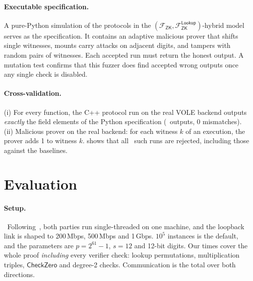 \documentclass[10pt,twocolumn]{article}
\theoremstyle{remark}
\newcommand{\Fzk}{\mathcal{F}_{\mathsf{ZK}}}
\newcommand{\Flk}{\mathcal{F}^{\mathsf{Lookup}}_{\mathsf{ZK}}}
\newcommand{\CZ}{\mathsf{CheckZero}}
\begin{document}
\paragraph{Executable specification.} A pure-Python simulation of the protocols in the
$(\Fzk,\Flk)$-hybrid model serves as the specification. It contains an adaptive malicious prover
that shifts single witnesses, mounts carry attacks on adjacent digits, and tampers with random
pairs of witnesses. Each accepted run must return the honest output. A mutation test confirms that
this fuzzer does find accepted wrong outputs once any single check is disabled.

\paragraph{Cross-validation.} (i) For every function, the C++ protocol run on the real VOLE
backend outputs \emph{exactly} the field elements of the Python specification (\CrossN\ outputs, 0
mismatches). (ii) Malicious prover on the real backend: for each witness $k$ of an execution, the
prover adds 1 to witness $k$.  shows that all \SoundTotal\ such runs are
rejected, including those against the baselines.



\section{Evaluation}\label{sec:eval}

\paragraph{Setup.} \Setup\ Following~\cite{hao2024scalable}, both parties run single-threaded on
one machine, and the loopback link is shaped to 200\,Mbps, 500\,Mbps and 1\,Gbps. $10^5$ instances
is the default, and the parameters are $p=2^{61}-1$, $s=12$ and 12-bit digits. Our times cover the
whole proof \emph{including} every verifier check: lookup permutations, multiplication triples,
$\CZ$ and degree-2 checks. Communication is the total over both directions.
\end{document}
